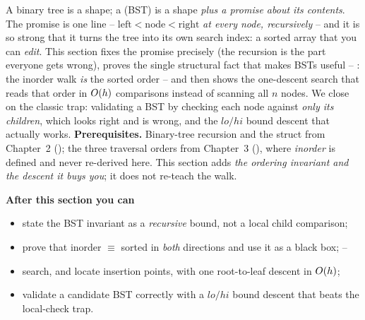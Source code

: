 \begin{topicintro}
A binary tree is a shape; a  (BST) is a shape \emph{plus a promise about
its contents}. The promise is one line -- $\text{left} < \text{node} < \text{right}$ \emph{at every
node, recursively} -- and it is so strong that it turns the tree into its own search index: a
sorted array that you can \emph{edit}. This section fixes the promise precisely (the recursion is
the part everyone gets wrong), proves the single structural fact that makes BSTs useful --
: the inorder walk \emph{is} the sorted order -- and then shows the one-descent
search that reads that order in $O(h)$ comparisons instead of scanning all $n$ nodes. We close
on the classic trap: validating a BST by checking each node against \emph{only its children}, which
looks right and is wrong, and the $\mathit{lo}/\mathit{hi}$ bound descent that actually works.
\textbf{Prerequisites.} Binary-tree recursion and the  struct from Chapter~2
(); the three traversal orders from Chapter~3 (), where \emph{inorder} is
defined and never re-derived here. This section adds \emph{the ordering invariant and the descent
it buys you}; it does not re-teach the walk.

\textbf{After this section you can}
\begin{itemize}[nosep]
  \item state the BST invariant as a \emph{recursive} bound, not a local child comparison; \hfill{}
  \item prove that inorder $\equiv$ sorted in \emph{both} directions and use it as a black box; \hfill{}--
  \item search, and locate insertion points, with one root-to-leaf descent in $O(h)$; \hfill{}
  \item validate a candidate BST correctly with a $\mathit{lo}/\mathit{hi}$ bound descent that
        beats the local-check trap. \hfill{}
\end{itemize}
\end{topicintro}

